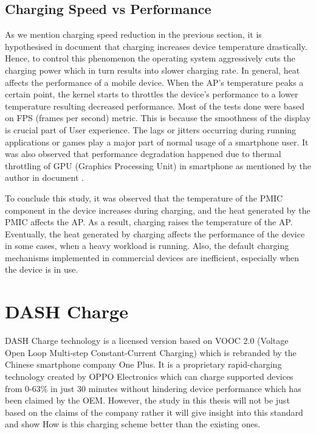 \documentclass[conference]{IEEEtran}
\begin{document}
\subsection{Charging Speed vs Performance}

As we mention charging speed reduction in the previous section, it is hypothesised in document \cite{b1} that charging increases device temperature drastically. Hence, to control this phenomenon the operating system aggressively cuts the charging power which in turn results into slower charging rate. In general, heat affects the performance of a mobile device. When the AP’s temperature peaks a certain point, the kernel starts to throttles the device’s performance to a lower temperature resulting decreased performance. Most of the tests done were based on FPS (frames per second) metric. This is because the smoothness of the display is crucial part of User experience. The lags or jitters occurring during running applications or games play a major part of normal usage of a smartphone user. It was also observed that performance degradation happened due to thermal throttling of GPU (Graphics Processing Unit) in smartphone as mentioned by the author in document \cite{b1}.    

To conclude this study, it was observed that the temperature of the PMIC component in the device increases during charging, and the heat generated by the PMIC affects the AP. As a result, charging raises the temperature of the AP. Eventually, the heat generated by charging affects the performance of the device
in some cases, when a heavy workload is running. Also, the default charging mechanisms implemented in commercial devices are inefficient, especially when the device is in use. 

\section{DASH Charge}

DASH Charge technology is a licensed version based on VOOC 2.0 (Voltage Open Loop Multi-step Constant-Current Charging)\cite{b14} which is rebranded by the Chinese smartphone company One Plus. It is a proprietary rapid-charging technology created by OPPO Electronics which can charge supported devices from 0-63\% in just 30 minutes without hindering device performance which has been claimed by the OEM. \cite{b6}  However, the study in this thesis will not be just based on the claims of the company rather it will give insight into this standard and show How is this charging scheme better than the existing ones.
\end{document}
